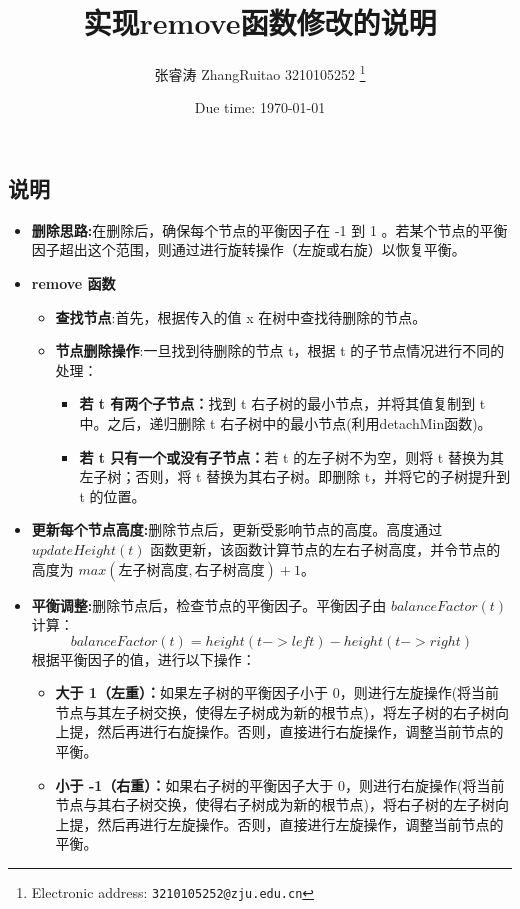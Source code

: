 \documentclass[a4paper]{article}
\begin{document}
\title{实现remove函数修改的说明}

\author{张睿涛 ZhangRuitao 3210105252
  \thanks{Electronic address: \texttt{3210105252@zju.edu.cn}}}

\date{Due time: \today}
\maketitle
\begin{onehalfspacing}

\section*{说明}
\begin{itemize}
    \item  \textbf{删除思路:}在删除后，确保每个节点的平衡因子在 -1 到 1 。若某个节点的平衡因子超出这个范围，则通过进行旋转操作（左旋或右旋）以恢复平衡。
    \item  \textbf{remove 函数}
    \begin{itemize}
        \item \textbf{查找节点}:首先，根据传入的值 x 在树中查找待删除的节点。
        \item \textbf{节点删除操作}:一旦找到待删除的节点 t，根据 t 的子节点情况进行不同的处理：
        \begin{itemize}
            \item \textbf{若 t 有两个子节点：}找到 t 右子树的最小节点，并将其值复制到 t 中。之后，递归删除 t 右子树中的最小节点(利用detachMin函数)。
            \item \textbf{若 t 只有一个或没有子节点：}若 t 的左子树不为空，则将 t 替换为其左子树；否则，将 t 替换为其右子树。即删除 t，并将它的子树提升到 t 的位置。
        \end{itemize}
    \end{itemize}
    \item \textbf{更新每个节点高度:}删除节点后，更新受影响节点的高度。高度通过 $updateHeight(t)$ 函数更新，该函数计算节点的左右子树高度，并令节点的高度为 $max(\text{左子树高度}, \text{右子树高度}) + 1$。
    \item \textbf{平衡调整:}删除节点后，检查节点的平衡因子。平衡因子由 
    $ balanceFactor(t)$ 计算：\\
    \[
    balanceFactor(t) = height(t->left) - height(t->right)
    \]
    根据平衡因子的值，进行以下操作：
    \begin{itemize}
        \item \textbf{大于 1（左重）：}如果左子树的平衡因子小于 0，则进行左旋操作(将当前节点与其左子树交换，使得左子树成为新的根节点)，将左子树的右子树向上提，然后再进行右旋操作。否则，直接进行右旋操作，调整当前节点的平衡。
        \item \textbf{小于 -1（右重）：}如果右子树的平衡因子大于 0，则进行右旋操作(将当前节点与其右子树交换，使得右子树成为新的根节点)，将右子树的左子树向上提，然后再进行左旋操作。否则，直接进行左旋操作，调整当前节点的平衡。
    \end{itemize}
\end{itemize}
\end{onehalfspacing}
\end{document}
